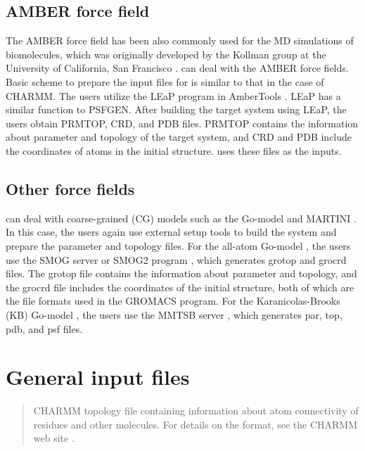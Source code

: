 \documentclass[a4paper,11pt,oneside,english]{sphinxmanual}
\begin{document}
\subsection{AMBER force field}
\label{\detokenize{03_Input:amber-force-field}}
The AMBER force field has been also commonly used for the MD simulations of
biomolecules, which was originally developed by the Kollman group at the
University of California, San Francisco .  can deal with the
AMBER force fields. Basic scheme to prepare the input files for 
is similar to that in the case of CHARMM. The users utilize the LEaP program in AmberTools .
LEaP has a similar function to PSFGEN. After building the target system using LEaP,
the users obtain PRMTOP, CRD, and PDB files. PRMTOP contains the information about
parameter and topology of the target system, and CRD and PDB include
the coordinates of atoms in the initial structure.  uses
these files as the inputs.


\subsection{Other force fields}
\label{\detokenize{03_Input:other-force-fields}}
 can deal with coarse-grained (CG) models such as the Go-model  and MARTINI .
In this case, the users again use external setup tools to build the system and prepare
the parameter and topology files. For the all-atom Go-model ,
the users use the SMOG server  or SMOG2 program ,
which generates grotop and grocrd files. The grotop file contains
the information about parameter and topology, and the grocrd file includes
the coordinates of the initial structure, both of which are the file formats
used in the GROMACS program. For the Karanicolas-Brooks (KB) Go-model  ,
the users use the MMTSB server , which generates par, top, pdb, and psf files.


\section{General input files}
\label{\detokenize{03_Input:general-input-files}}
\begin{quote}

CHARMM topology file containing information about atom connectivity
of residues and other molecules.
For details on the format, see the CHARMM web site .
\end{quote}
\end{document}
